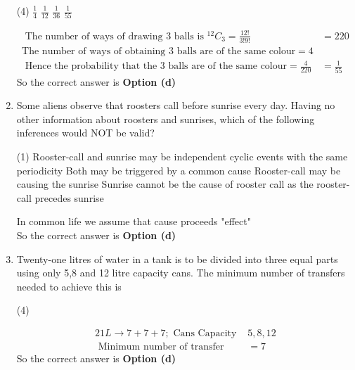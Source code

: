 \begin{enumerate}
 \begin{tasks}(4)
	\task[\textbf{a.}]$\frac{1}{4}$
	\task[\textbf{b.}] $\frac{1}{12}$
	\task[\textbf{c.}]$\frac{1}{36}$
	\task[\textbf{d.}]$\frac{1}{55}$ 
\end{tasks}
\begin{answer}
	\begin{align*}
	\text { The number of ways of drawing } 3 \text { balls is }{ }^{12} C_{3}=\frac{12 !}{3 ! 9 !}&=220\\
	\text{The number of ways of obtaining 3 balls are of the same colour} =4\\
\text{	Hence the probability that the 3 balls are of the same colour} =\frac{4}{220}&=\frac{1}{55}
	\end{align*}
		So the correct answer is \textbf{Option (d)}
\end{answer}
\item  Some aliens observe that roosters call before sunrise every day. Having no other information about roosters and sunrises, which of the following inferences would NOT be valid?
 \begin{tasks}(1)
	\task[\textbf{a.}]Rooster-call and sunrise may be independent cyclic events with the same periodicity
	\task[\textbf{b.}]Both may be triggered by a common cause
	\task[\textbf{c.}]Rooster-call may be causing the sunrise
	\task[\textbf{d.}]Sunrise cannot be the cause of rooster call as the rooster-call precedes sunrise 
\end{tasks}
\begin{answer}
	 In common life we assume that cause proceeds "effect" \\
	So the correct answer is \textbf{Option (d)}
\end{answer}
\item  Twenty-one litres of water in a tank is to be divided into three equal parts using only 5,8 and 12 litre capacity cans. The minimum number of transfers needed to achieve this is
 \begin{tasks}(4)
\end{tasks}
\begin{answer}
	\begin{align*}
	21 L \rightarrow 7+7+7 ; \text { Cans Capacity }& 5,8,12\\
	\text { Minimum number of transfer }&=7
	\end{align*}
		So the correct answer is \textbf{Option (d)}
\end{answer}

\end{enumerate}
